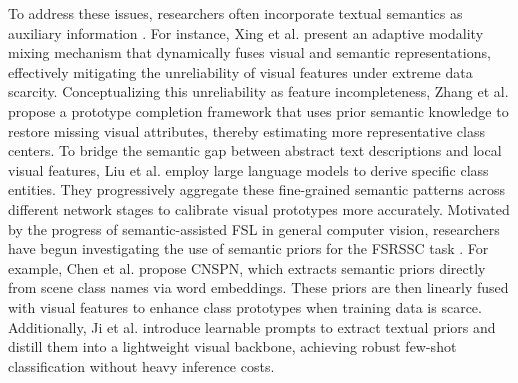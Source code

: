 \documentclass[lettersize,journal]{IEEEtran}
\begin{document}
To address these issues, researchers often incorporate textual semantics as auxiliary information \cite{AM3,li2020boosting,PCPK,zhang2024simple,ECER-FSL,li2024knn}.
For instance, Xing et al. \cite{AM3} present an adaptive modality mixing mechanism that dynamically fuses visual and semantic representations, effectively mitigating the unreliability of visual features under extreme data scarcity.
Conceptualizing this unreliability as feature incompleteness, Zhang et al. \cite{PCPK} propose a prototype completion framework that uses prior semantic knowledge to restore missing visual attributes, thereby estimating more representative class centers.
To bridge the semantic gap between abstract text descriptions and local visual features, Liu et al. \cite{ECER-FSL} employ large language models to derive specific class entities. 
They progressively aggregate these fine-grained semantic patterns across different network stages to calibrate visual prototypes more accurately.
Motivated by the progress of semantic-assisted FSL in general computer vision, researchers have begun investigating the use of semantic priors for the FSRSSC task \cite{CNSPN,TeAw,MVITP,ProDFSL}.
For example, Chen et al. \cite{CNSPN} propose CNSPN, which extracts semantic priors directly from scene class names via word embeddings. 
These priors are then linearly fused with visual features to enhance class prototypes when training data is scarce.
Additionally, Ji et al. \cite{ProDFSL} introduce learnable prompts to extract textual priors and distill them into a lightweight visual backbone, achieving robust few-shot classification without heavy inference costs.
\end{document}
